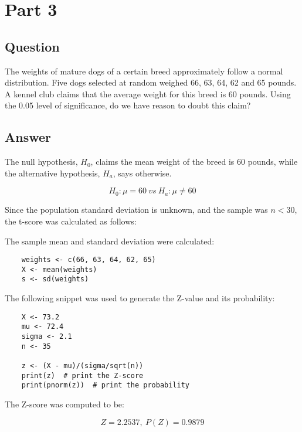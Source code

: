 \section{Part 3}
    \subsection{Question}
    The weights of mature dogs of a certain breed approximately follow a normal distribution. Five dogs selected at random weighed 66, 63, 64, 62 and 65 pounds. A kennel club claims that the average weight for this breed is 60 pounds. Using the 0.05 level of significance, do we have reason to doubt this claim?

    \subsection{Answer}
    The null hypothesis, $H_{0}$, claims the mean weight of the breed is 60 pounds, while the alternative hypothesis, $H_{a}$, says otherwise.

        \[ H_{0}: \mu = 60 \ vs \ H_{a}: \mu \neq 60 \]

    Since the population standard deviation is unknown, and the sample was $n < 30$, the t-score was calculated as follows:

    The sample mean and standard deviation were calculated:
\begin{lstlisting}
    weights <- c(66, 63, 64, 62, 65)
    X <- mean(weights)
    s <- sd(weights)
\end{lstlisting}

        


    The following snippet was used to generate the Z-value and its probability:
\begin{lstlisting}
    X <- 73.2
    mu <- 72.4
    sigma <- 2.1
    n <- 35

    z <- (X - mu)/(sigma/sqrt(n))
    print(z)  # print the Z-score
    print(pnorm(z))  # print the probability
\end{lstlisting}

    The Z-score was computed to be:

        \[ Z=2.2537, \ P(Z) =0.9879 \]
